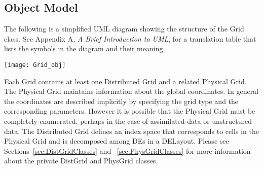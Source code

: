 %

\subsection{Object Model}

The following is a simplified UML diagram showing the structure of the
Grid class.  See Appendix A, {\it A Brief Introduction to UML},
for a translation table that lists the symbols in the diagram and their 
meaning.

\begin{center}
\texttt{[image: Grid\_obj]}   
\end{center}

Each Grid contains at least one Distributed Grid and a related Physical Grid.
The Physical Grid maintains information about the global coordinates.  In
general the coordinates are described implicitly by specifying the grid type
and the corresponding parameters.  However it is possible that the Physical
Grid must be completely enumerated, perhaps in the case of assimilated data
or unstructured data.  The Distributed Grid defines an index space that
corresponds to cells in the Physical Grid and is decomposed among DEs in a
DELayout.  Please see Sections~\ref{sec:DistGridClasses} and
~\ref{sec:PhysGridClasses} for more information about the private
DistGrid and PhysGrid classes.


